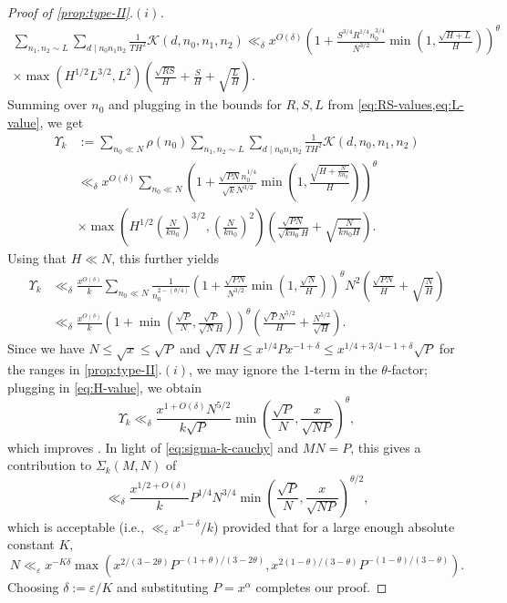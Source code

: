 \documentclass[reqno,11pt]{amsart}
\theoremstyle{remark}
\numberwithin{equation}{section}
\newcommand{\mK}{\mathcal{K}}
\newcommand{\eps}{\varepsilon}
\begin{document}
\begin{proof}[Proof of \cref{prop:type-II}.$(i)$]
\[
\begin{aligned}
    \sum_{n_1, n_2 \sim L}
    \sum_{d \mid n_0 n_1 n_2}
    \frac{1}{TH^2} \mK(d, n_0, n_1, n_2)
    \ll_\delta 
    x^{O(\delta)}
    \left(1 + \frac{S^{3/4} R^{1/4} n_0^{3/4}}{N^{3/2}} \min\left(1, \frac{\sqrt{H+L}}{H}\right) \right)^\theta
    \\
    \times
    \max\left(H^{1/2} L^{3/2}, L^2\right)
    \left(\frac{\sqrt{RS}}{H} + \frac{S}{H} + \sqrt{\frac{L}{H}}\right).
\end{aligned}
\]
Summing over $n_0$ and plugging in the bounds for $R, S, L$ from \cref{eq:RS-values,eq:L-value}, we get
\[
\begin{aligned}
    \Upsilon_k 
    &:= 
    \sum_{n_0 \ll N} \rho(n_0) \sum_{n_1, n_2 \sim L} \sum_{d \mid n_0 n_1 n_2} \frac{1}{TH^2} \mK(d, n_0, n_1, n_2)
    \\
    &\ll_\delta 
    x^{O(\delta)}
    \sum_{n_0 \ll N} 
    \left(1 + \frac{\sqrt{PN} n_0^{1/4}}{\sqrt{k} N^{3/2}} \min\left(1, \frac{\sqrt{H+\frac{N}{kn_0}}}{H}\right) \right)^\theta
    \\
    &\times
    \max\left(H^{1/2} \left(\frac{N}{kn_0}\right)^{3/2}, \left(\frac{N}{kn_0}\right)^2\right)
    \left(\frac{\sqrt{PN}}{\sqrt{k n_0} H} + \sqrt{\frac{N}{kn_0 H}}\right).
\end{aligned}
\]
Using that $H \ll N$, this further yields
\[
\begin{aligned}
    \Upsilon_k 
    &\ll_\delta 
    \frac{x^{O(\delta)}}{k}
    \sum_{n_0 \ll N} 
    \frac{1}{n_0^{2-(\theta/4)}}
    \left(1 + \frac{\sqrt{PN}}{N^{3/2}} \min\left(1, \frac{\sqrt{N}}{H}\right) \right)^\theta
    N^2
    \left(\frac{\sqrt{PN}}{H} + \sqrt{\frac{N}{H}}\right)
    \\
    &\ll_\delta
    \frac{x^{O(\delta)}}{k} 
    \left(1 + \min\left(\frac{\sqrt{P}}{N}, \frac{\sqrt{P}}{\sqrt{N} H}\right) \right)^\theta 
    \left( 
    \frac{\sqrt{P} N^{5/2}}{H} + \frac{N^{5/2}}{\sqrt{H}}
    \right).
\end{aligned}
\]
Since we have $N \le \sqrt{x} \le \sqrt{P}$ and $\sqrt{N}H \le x^{1/4} P x^{-1+\delta} \le x^{1/4 + 3/4 -1 + \delta} \sqrt{P}$ for the ranges in \cref{prop:type-II}.$(i)$, we may ignore the $1$-term in the $\theta$-factor; plugging in \cref{eq:H-value}, we obtain
\[
    \Upsilon_k \ll_\delta 
    \frac{x^{1+O(\delta)} N^{5/2}}{k \sqrt{P}} 
    \min\left(\frac{\sqrt{P}}{N}, \frac{x}{\sqrt{NP}}\right)^\theta,
\]
which improves \cite[(3.7)]{merikoski2023largest}. In light of \cref{eq:sigma-k-cauchy} and $MN = P$, this gives a contribution to $\Sigma_k(M, N)$ of
\[
    \ll_\delta 
    \frac{x^{1/2+O(\delta)}}{k}
    P^{1/4} N^{3/4}
    \min\left(\frac{\sqrt{P}}{N}, \frac{x}{\sqrt{NP}}\right)^{\theta/2},
\]
which is acceptable (i.e., $\ll_\eps x^{1-\delta}/k$) provided that for a large enough absolute constant $K$,
\[
    N \ll_\eps x^{-K\delta} \max\left(x^{2/(3-2\theta)} P^{-(1+\theta)/(3-2\theta)}, x^{2(1-\theta)/(3-\theta)} P^{-(1-\theta)/(3-\theta)} \right).
\]
Choosing $\delta := \eps/K$ and substituting $P = x^\alpha$ completes our proof.
\end{proof}
\end{document}
